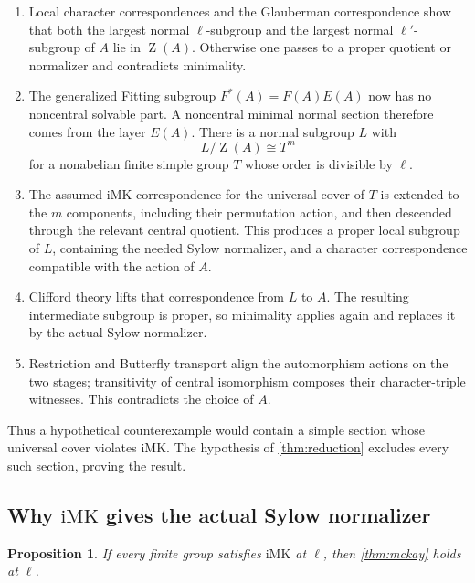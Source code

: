 \documentclass[11pt]{article}
\newtheorem{proposition}[theorem]{Proposition}
\newcommand{\Z}{\operatorname{Z}}
\newcommand{\IMK}{\mathrm{iMK}}
\begin{document}
\begin{enumerate}
  \item Local character correspondences and the Glauberman
  correspondence show that both the largest normal \(\ell\)-subgroup
  and the largest normal \(\ell'\)-subgroup of \(A\) lie in \(\Z(A)\).
  Otherwise one passes to a proper quotient or normalizer and contradicts
  minimality.
  \item The generalized Fitting subgroup
  \(F^*(A)=F(A)E(A)\) now has no noncentral solvable part.  A noncentral
  minimal normal section therefore comes from the layer \(E(A)\).  There
  is a normal subgroup \(L\) with
  \[
    L/\Z(A)\cong T^m
  \]
  for a nonabelian finite simple group \(T\) whose order is divisible by
  \(\ell\).
  \item The assumed \(\IMK\) correspondence for the universal cover of
  \(T\) is extended to the \(m\) components, including their permutation
  action, and then descended through the relevant central quotient.
  This produces a proper local subgroup of \(L\), containing the needed
  Sylow normalizer, and a character correspondence compatible with the
  action of \(A\).
  \item Clifford theory lifts that correspondence from \(L\) to \(A\).
  The resulting intermediate subgroup is proper, so minimality applies
  again and replaces it by the actual Sylow normalizer.
  \item Restriction and Butterfly transport align the automorphism
  actions on the two stages; transitivity of central isomorphism composes
  their character-triple witnesses.  This contradicts the choice of
  \(A\).
\end{enumerate}

Thus a hypothetical counterexample would contain a simple section whose
universal cover violates \(\IMK\).  The hypothesis of
\cref{thm:reduction} excludes every such section, proving the result.

\subsection{\texorpdfstring{Why \(\IMK\) gives the actual Sylow normalizer}
  {Why iMK gives the actual Sylow normalizer}}

\begin{proposition}\label{prop:imk-to-mckay}
If every finite group satisfies \(\IMK\) at \(\ell\), then
\cref{thm:mckay} holds at \(\ell\).
\end{proposition}
\end{document}
